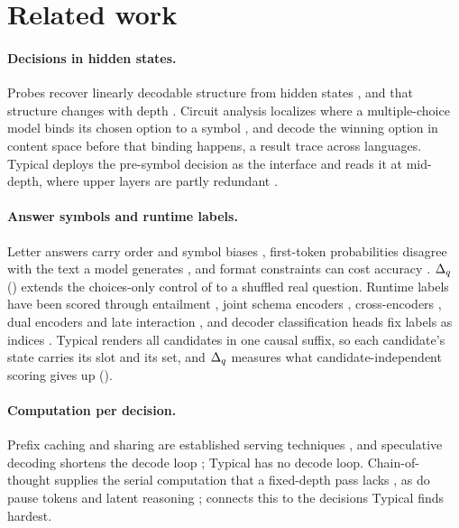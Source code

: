 \section{Related work}
\label{sec:related}

\paragraph{Decisions in hidden states.} Probes recover linearly decodable structure from hidden states
\citep{alain2017probes}, and that structure changes with depth \citep{tenney2019pipeline,belrose2023tunedlens}.
Circuit analysis localizes where a multiple-choice model binds its chosen option to a symbol
\citep{lieberum2023circuit}, and \citet{wong2026models} decode the winning option in content space
before that binding happens, a result \citet{bhatt2026representation} trace across languages. Typical
deploys the pre-symbol decision as the interface and reads it at mid-depth, where upper layers are
partly redundant \citep{gromov2024deeperlayers,men2024shortgpt}.

\paragraph{Answer symbols and runtime labels.} Letter answers carry order and symbol biases
\citep{zheng2024selectionbias,pezeshkpour2024optionorder}, first-token probabilities disagree with the
text a model generates \citep{wang2024firsttoken}, and format constraints can cost accuracy
\citep{tam2024speakfreely}. $\Delta_q$ () extends the choices-only control of
\citet{balepur2024artifacts} to a shuffled real question. Runtime labels have been scored through
entailment \citep{yin2019zeroshot}, joint schema encoders \citep{zaratiana2025gliner2}, cross-encoders
\citep{nogueira2019bertrerank}, dual encoders \citep{reimers2019sbert} and late interaction
\citep{humeau2020polyencoders,khattab2020colbert}, and decoder classification heads fix labels as
indices \citep{li2023labelsupervised}. Typical renders all candidates in one causal suffix, so each
candidate's state carries its slot and its set, and $\Delta_q$ measures what candidate-independent scoring
gives up ().

\paragraph{Computation per decision.} Prefix caching and sharing are established serving techniques
\citep{kwon2023pagedattention,zheng2023sglang,gim2023promptcache}, and speculative decoding shortens the
decode loop \citep{leviathan2023speculative}; Typical has no decode loop. Chain-of-thought supplies the
serial computation that a fixed-depth pass lacks \citep{wei2022cot,merrill2023parallelism,feng2023chain,
merrill2024expressive}, as do pause tokens \citep{goyal2024pause} and latent reasoning
\citep{hao2024coconut};  connects this to the decisions Typical finds hardest.

